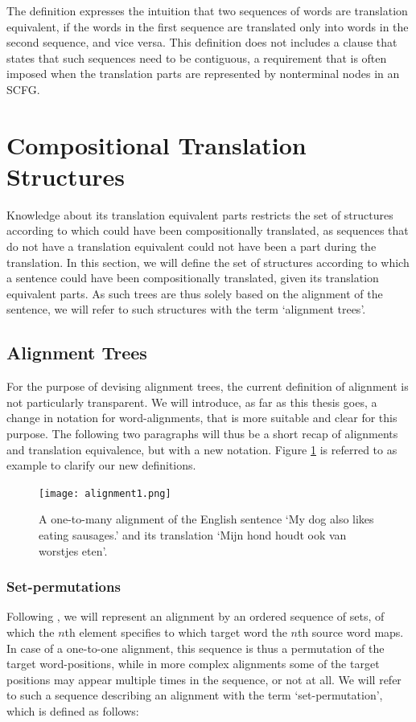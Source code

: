 \documentclass{report}
\begin{document}
The definition expresses the intuition that two sequences of words are translation equivalent, if the words in the first sequence are translated only into words in the second sequence, and vice versa. This definition does not includes a clause that states that such sequences need to be contiguous, a requirement that is often imposed when the translation parts are represented by nonterminal nodes in an SCFG.

\section{Compositional Translation Structures}
\label{sec:comp_structures}

Knowledge about its translation equivalent parts restricts the set of structures according to which could have been compositionally translated, as sequences that do not have a translation equivalent could not have been a part during the translation. In this section, we will define the set of structures according to which a sentence could have been compositionally translated, given its translation equivalent parts. As such trees are thus solely based on the alignment of the sentence, we will refer to such structures with the term  `alignment trees'.


\subsection{Alignment Trees}

For the purpose of devising alignment trees, the current definition of alignment is not particularly transparent. We will introduce, as far as this thesis goes, a change in notation for word-alignments, that is more suitable and clear for this purpose. The following two paragraphs will thus be a short recap of alignments and translation equivalence, but with a new notation. Figure \ref{fig:alignment2} is referred to as example to clarify our new definitions.

\begin{figure}
\centering
\texttt{[image: alignment1.png]}
\caption{A one-to-many alignment of the English sentence `My dog also likes eating sausages.' and its translation `Mijn hond houdt ook van worstjes eten'.%
\cite{maillette2010visualizing}
}\label{fig:alignment2}
\end{figure}

\subsubsection{Set-permutations}
Following \cite{simaan2013hats}, we will represent an alignment by an ordered sequence of sets, of which the $n$th element specifies to which target word the $n$th source word maps. In case of a one-to-one alignment, this sequence is thus a permutation of the target word-positions, while in more complex alignments some of the target positions may appear multiple times in the sequence, or not at all. We will refer to such a sequence describing an alignment with the term `set-permutation', which is defined as follows:
\end{document}
